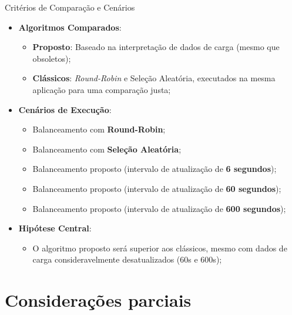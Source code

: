 \documentclass[10pt]{beamer}
\begin{document}
\begin{frame}{Critérios de Comparação e Cenários}

\begin{itemize}
    \item \textbf{Algoritmos Comparados}:
    \begin{itemize}
        \item \textbf{Proposto}: Baseado na interpretação de dados de carga (mesmo que obsoletos);
        \item \textbf{Clássicos}: \textit{Round-Robin} e Seleção Aleatória, executados na mesma aplicação para uma comparação justa;
    \end{itemize}
    
    \bigskip
    
    \item \textbf{Cenários de Execução}:
    \begin{itemize}
        \item Balanceamento com \textbf{Round-Robin};
        \item Balanceamento com \textbf{Seleção Aleatória};
        \item Balanceamento proposto (intervalo de atualização de \textbf{6 segundos});
        \item Balanceamento proposto (intervalo de atualização de \textbf{60 segundos});
        \item Balanceamento proposto (intervalo de atualização de \textbf{600 segundos});
    \end{itemize}
    
    \bigskip
    
    \item \textbf{Hipótese Central}:
    \begin{itemize}
        \item O algoritmo proposto será superior aos clássicos, mesmo com dados de carga consideravelmente desatualizados (60s e 600s);
    \end{itemize}
\end{itemize}

\end{frame}


\section{Considerações parciais}
\end{document}

